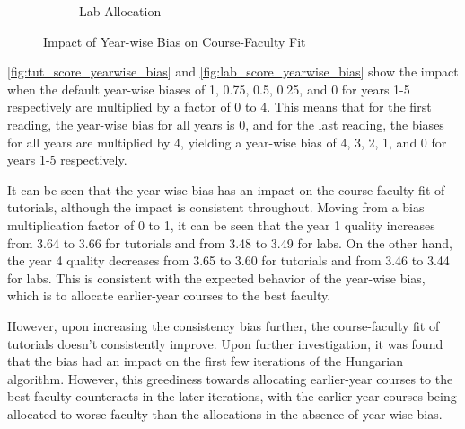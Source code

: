 \begin{figure}[H]
\begin{subfigure}[ht]{0.4\linewidth}
    \caption{Lab Allocation}
    \label{fig:lab_score_yearwise_bias}
  \end{subfigure}
  \caption{Impact of Year-wise Bias on Course-Faculty Fit}
\end{figure}

\autoref{fig:tut_score_yearwise_bias} and \autoref{fig:lab_score_yearwise_bias} show the impact when the default year-wise biases of 1, 0.75, 0.5, 0.25, and 0 for years 1-5 respectively are multiplied by a factor of 0 to 4. This means that for the first reading, the year-wise bias for all years is 0, and for the last reading, the biases for all years are multiplied by 4, yielding a year-wise bias of 4, 3, 2, 1, and 0 for years 1-5 respectively.

It can be seen that the year-wise bias has an impact on the course-faculty fit of tutorials, although the impact is consistent throughout. Moving from a bias multiplication factor of 0 to 1, it can be seen that the year 1 quality increases from 3.64 to 3.66 for tutorials and from 3.48 to 3.49 for labs. On the other hand, the year 4 quality decreases from 3.65 to 3.60 for tutorials and from 3.46 to 3.44 for labs. This is consistent with the expected behavior of the year-wise bias, which is to allocate earlier-year courses to the best faculty.

However, upon increasing the consistency bias further, the course-faculty fit of tutorials doesn't consistently improve. Upon further investigation, it was found that the bias had an impact on the first few iterations of the Hungarian algorithm. However, this greediness towards allocating earlier-year courses to the best faculty counteracts in the later iterations, with the earlier-year courses being allocated to worse faculty than the allocations in the absence of year-wise bias.

